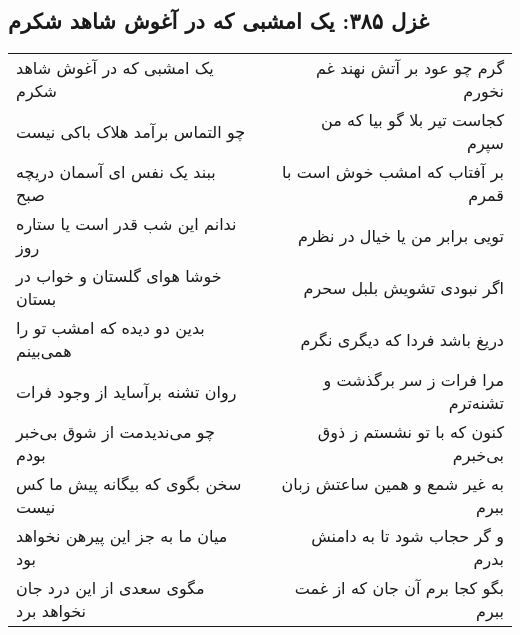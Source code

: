 \begin{center}
\section*{غزل ۳۸۵: یک امشبی که در آغوش شاهد شکرم}
\label{sec:385}
\begin{longtable}{l p{0.5cm} r}
یک امشبی که در آغوش شاهد شکرم
&&
گرم چو عود بر آتش نهند غم نخورم
\\
چو التماس برآمد هلاک باکی نیست
&&
کجاست تیر بلا گو بیا که من سپرم
\\
ببند یک نفس ای آسمان دریچه صبح
&&
بر آفتاب که امشب خوش است با قمرم
\\
ندانم این شب قدر است یا ستاره روز
&&
تویی برابر من یا خیال در نظرم
\\
خوشا هوای گلستان و خواب در بستان
&&
اگر نبودی تشویش بلبل سحرم
\\
بدین دو دیده که امشب تو را همی‌بینم
&&
دریغ باشد فردا که دیگری نگرم
\\
روان تشنه برآساید از وجود فرات
&&
مرا فرات ز سر برگذشت و تشنه‌ترم
\\
چو می‌ندیدمت از شوق بی‌خبر بودم
&&
کنون که با تو نشستم ز ذوق بی‌خبرم
\\
سخن بگوی که بیگانه پیش ما کس نیست
&&
به غیر شمع و همین ساعتش زبان ببرم
\\
میان ما به جز این پیرهن نخواهد بود
&&
و گر حجاب شود تا به دامنش بدرم
\\
مگوی سعدی از این درد جان نخواهد برد
&&
بگو کجا برم آن جان که از غمت ببرم
\\
\end{longtable}
\end{center}
